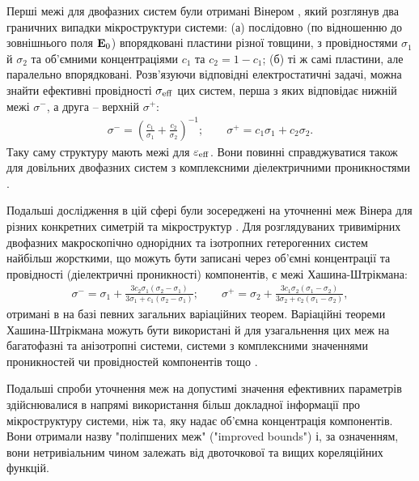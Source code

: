 \documentclass[14pt,twoside]{vakthesis}
\begin{document}
Перші межі для двофазних систем були отримані Вінером \cite{Wiener1912}, який розглянув два граничних випадки  мікроструктури системи: 
(а) послідовно (по відношенню до зовнішнього поля ${\bf E}_0$) впорядковані пластини різної товщини, з провідностями $\sigma_1$ й $\sigma_2$ та об'ємними концентраціями $c_1$ та $c_2=1-c_1$; (б) ті ж самі пластини, але паралельно впорядковані. 
Розв'язуючи відповідні електростатичні задачі, можна знайти  ефективні провідності $\sigma_{\rm eff}$ цих систем, перша з яких відповідає нижній межі $\sigma^{-}$, а друга -- верхній $\sigma^{+}$:
\begin{equation}\label{eq:wiener-bounds}
\begin{split}
\sigma^{-} = \left( \frac{c_1}{\sigma_1} + \frac{c_2}{\sigma_2} \right)^{-1};\qquad
\sigma^{+} = c_1 \sigma_1 + c_2 \sigma_2.
\end{split}
\end{equation}
Таку  саму структуру мають межі для   $\varepsilon_{\rm eff}$.
Вони повинні справджуватися також для довільних двофазних систем з комплексними діелектричними проникностями \cite{Aspnes1982}.

Подальші дослідження в цій сфері були зосереджені на уточненні меж Вінера для різних конкретних симетрій та мікроструктур \cite{Torquato,Sihvola1999,Milton}. Для розглядуваних тривимірних двофазних макроскопічно однорідних та ізотропних гетерогенних систем найбільш жорсткими, що можуть бути записані через об'ємні концентрації та провідності (діелектричні проникності)  компонентів, є межі Хашина-Штрікмана:
\begin{equation}\label{eq:HS-bounds}
	\begin{split}
	\sigma^{-} = \sigma_1 + \frac{3c_2 \sigma_1(\sigma_2-\sigma_1)}{3\sigma_1 + c_1(\sigma_2-\sigma_1)};\qquad
	\sigma^{+} = \sigma_2 + \frac{3c_1 \sigma_2(\sigma_1-\sigma_2)}{3\sigma_2 + c_2(\sigma_1-\sigma_2)},
	\end{split}
\end{equation}
отримані в \cite{HS1962} на базі певних загальних варіаційних теорем.
Варіаційні теореми Хашина-Штрікмана \cite{HS1962} можуть бути використані й для узагальнення цих меж на багатофазні та анізотропні системи, системи з комплексними значеннями проникностей чи провідностей компонентів тощо \cite{Torquato,Milton,Sihvola1999}. 

Подальші спроби уточнення меж на допустимі значення ефективних параметрів здійснювалися в напрямі використання більш докладної інформації про мікроструктуру системи, ніж та, яку надає об'ємна концентрація компонентів.  Вони отримали назву "поліпшених меж" ("improved bounds") \cite{Torquato,Sihvola1999} і, за означенням, вони нетривіальним чином залежать від двоточкової та вищих кореляційних функцій. 
\end{document}
